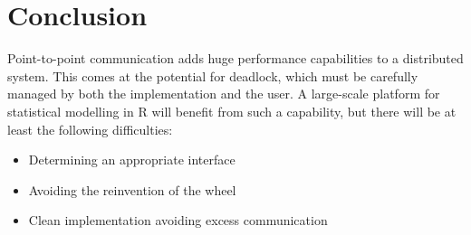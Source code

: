 \documentclass[a4paper,10pt]{article}
\begin{document}
\section{Conclusion}

Point-to-point communication adds huge performance capabilities to a
distributed system.
This comes at the potential for deadlock, which must be carefully managed by
both the implementation and the user.
A large-scale platform for statistical modelling in R will benefit from such a
capability, but there will be at least the following difficulties:

\begin{itemize}
	\item Determining an appropriate interface
	\item Avoiding the reinvention of the wheel
	\item Clean implementation avoiding excess communication
\end{itemize}

\printbibliography{}
\end{document}

